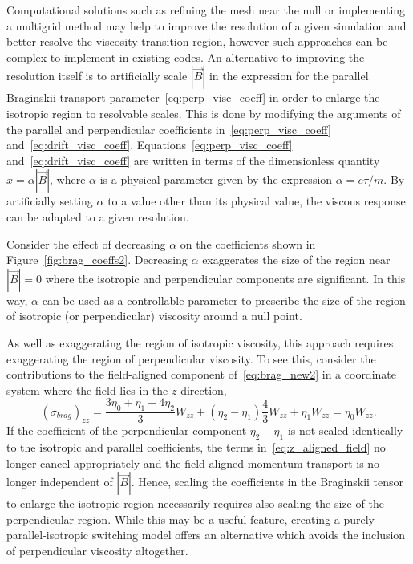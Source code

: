 Computational solutions such as refining the mesh near the null or implementing a multigrid method may help to improve the resolution of a given simulation and better resolve the viscosity transition region, however such approaches can be complex to implement in existing codes. An alternative to improving the resolution itself is to artificially scale $|\vec{B}|$ in the expression for the parallel Braginskii transport parameter~\eqref{eq:perp_visc_coeff} in order to enlarge the isotropic region to resolvable scales. This is done by modifying the arguments of the parallel and perpendicular coefficients in~\eqref{eq:perp_visc_coeff} and~\eqref{eq:drift_visc_coeff}. Equations~\eqref{eq:perp_visc_coeff} and~\eqref{eq:drift_visc_coeff} are written in terms of the dimensionless quantity $x = \alpha |\vec{B}|$, where $\alpha$ is a physical parameter given by the expression $\alpha = e \tau / m$. By artificially setting $\alpha$ to a value other than its physical value, the viscous response can be adapted to a given resolution.

Consider the effect of decreasing $\alpha$ on the coefficients shown in Figure~\ref{fig:brag_coeffs2}. Decreasing $\alpha$ exaggerates the size of the region near $|\vec{B}| = 0$ where the isotropic and perpendicular components are significant. In this way, $\alpha$ can be used as a controllable parameter to prescribe the size of the region of isotropic (or perpendicular) viscosity around a null point.

As well as exaggerating the region of isotropic viscosity, this approach requires exaggerating the region of perpendicular viscosity. To see this, consider the contributions to the field-aligned component of~\eqref{eq:brag_new2} in a coordinate system where the field lies in the $z$-direction,
\begin{equation}
  \label{eq:z_aligned_field}
(\sigma_{brag})_{zz} = \frac{3\eta_0+\eta_1-4\eta_2}{3} W_{zz} + (\eta_2 - \eta_1) \frac{4}{3} W_{zz} + \eta_1 W_{zz} = \eta_0 W_{zz}.
\end{equation}
If the coefficient of the perpendicular component $\eta_2 - \eta_1$ is not scaled identically to the isotropic and parallel coefficients, the terms in~\eqref{eq:z_aligned_field} no longer cancel appropriately and the field-aligned momentum transport is no longer independent of $|\vec{B}|$. Hence, scaling the coefficients in the Braginskii tensor to enlarge the isotropic region necessarily requires also scaling the size of the perpendicular region. While this may be a useful feature, creating a purely parallel-isotropic switching model offers an alternative which avoids the inclusion of perpendicular viscosity altogether.

